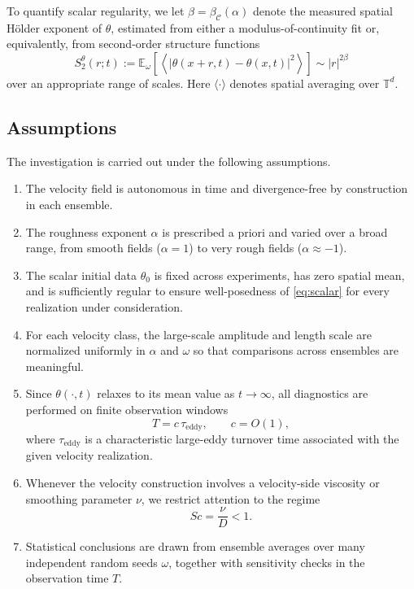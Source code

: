 To quantify scalar regularity, we let $\beta=\beta_{\mathcal{C}}(\alpha)$ denote the measured spatial H\"older exponent of $\theta$, estimated from either a modulus-of-continuity fit or, equivalently, from second-order structure functions
\begin{equation}
S_2^\theta(r;t)
:=
\mathbb{E}_\omega
\left[
\left\langle
|\theta(x+r,t)-\theta(x,t)|^2
\right\rangle
\right]
\sim |r|^{2\beta}
\label{eq:structure}
\end{equation}
over an appropriate range of scales. Here $\langle \cdot \rangle$ denotes spatial averaging over $\mathbb{T}^d$.

\subsection{Assumptions}

The investigation is carried out under the following assumptions.

\begin{enumerate}
    \item The velocity field is autonomous in time and divergence-free by construction in each ensemble.

    \item The roughness exponent $\alpha$ is prescribed a priori and varied over a broad range, from smooth fields ($\alpha=1$) to very rough fields ($\alpha\approx -1$).

    \item The scalar initial data $\theta_0$ is fixed across experiments, has zero spatial mean, and is sufficiently regular to ensure well-posedness of \eqref{eq:scalar} for every realization under consideration.

    \item For each velocity class, the large-scale amplitude and length scale are normalized uniformly in $\alpha$ and $\omega$ so that comparisons across ensembles are meaningful.

    \item Since $\theta(\cdot,t)$ relaxes to its mean value as $t\to\infty$, all diagnostics are performed on finite observation windows
    \begin{equation}
    T = c\,\tau_{\mathrm{eddy}},
    \qquad c = O(1),
    \label{eq:timewindow}
    \end{equation}
    where $\tau_{\mathrm{eddy}}$ is a characteristic large-eddy turnover time associated with the given velocity realization.

    \item Whenever the velocity construction involves a velocity-side viscosity or smoothing parameter $\nu$, we restrict attention to the regime
    \begin{equation}
    Sc = \frac{\nu}{D} < 1.
    \label{eq:schmidt}
    \end{equation}

    \item Statistical conclusions are drawn from ensemble averages over many independent random seeds $\omega$, together with sensitivity checks in the observation time $T$.
\end{enumerate}

